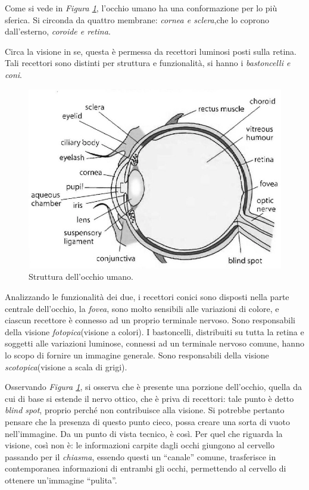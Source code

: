 \documentclass{subfiles}
\begin{document}
Come si vede in \emph{Figura \ref{Fig:1.1}}, l'occhio umano ha una conformazione per lo più sferica.
Si circonda da quattro membrane: \emph{cornea \emph{e} sclera},che lo coprono dall'esterno, \emph{coroide \emph{e} retina}.

Circa la visione in se, questa è permessa da recettori luminosi posti sulla retina.
Tali recettori sono distinti per struttura e funzionalità, si hanno i \emph{bastoncelli \emph{e} coni}.\\

\begin{figure}
    \includegraphics[scale = 0.4]{Images/Human Eye.png}
    \caption{Struttura dell'occhio umano.}
    \label{Fig:1.1}
\end{figure}

Analizzando le funzionalità dei due, i recettori conici sono disposti nella parte centrale dell'occhio, la \emph{fovea}, sono molto sensibili alle variazioni di colore,
e ciascun recettore è connesso ad un proprio terminale nervoso. Sono responsabili della visione \emph{fotopica}(visione a colori).
I bastoncelli, distribuiti su tutta la retina e soggetti alle variazioni luminose, connessi ad un terminale nervoso comune, hanno lo scopo di fornire un immagine generale.
Sono responsabili della visione \emph{scotopica}(visione a scala di grigi).

Osservando \emph{Figura \ref{Fig:1.1}}, si osserva che è presente una porzione dell'occhio, quella da cui di base si estende il nervo ottico,
che è priva di recettori: tale punto è detto \emph{blind spot}, proprio perché non contribuisce alla visione.
Si potrebbe pertanto pensare che la presenza di questo punto cieco, possa creare una sorta di vuoto nell'immagine.
Da un punto di vista tecnico, è così. Per quel che riguarda la visione, così non è: le informazioni carpite dagli occhi giungono al cervello passando per il \emph{chiasma},
essendo questi un ``canale'' comune, trasferisce in contemporanea informazioni di entrambi gli occhi, permettendo al cervello di ottenere un'immagine ``pulita''.
\end{document}
